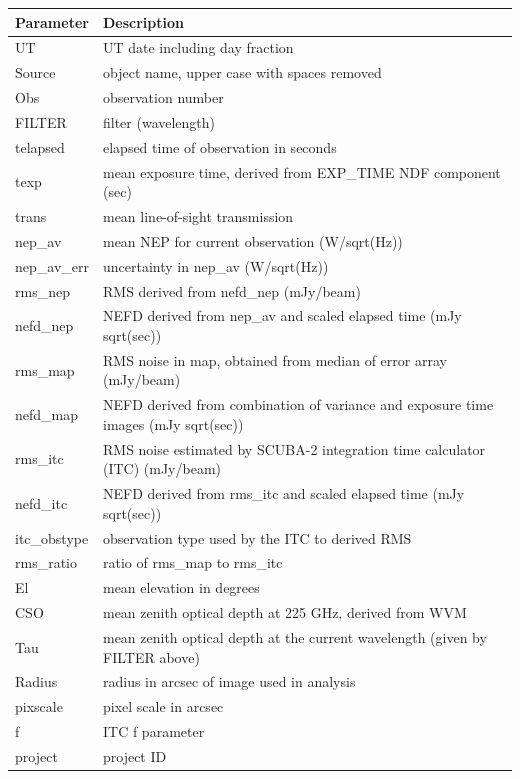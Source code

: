 \documentclass[11pt,oneside,chapters]{starlink}
\begin{document}
\begin{latexonly}
\begin{table}[h!]
\begin{center}
\begin{tabular}{|p{2.5cm}|p{12cm}|}
\hline
\textbf{Parameter} & \textbf{Description}\\
\hline
    UT & UT date including day fraction\\
    Source & object name, upper case with spaces removed\\
    Obs & observation number\\
    FILTER & filter (wavelength)\\
    telapsed & elapsed time of observation in seconds\\
    texp & mean exposure time, derived from EXP\_TIME NDF component (sec)\\
    trans & mean line-of-sight transmission\\
    nep\_av & mean NEP for current observation (W/sqrt(Hz))\\
    nep\_av\_err & uncertainty in nep\_av (W/sqrt(Hz))\\
    rms\_nep & RMS derived from nefd\_nep (mJy/beam)\\
    nefd\_nep & NEFD derived from nep\_av and scaled elapsed time (mJy sqrt(sec))\\
    rms\_map & RMS noise in map, obtained from median of error array (mJy/beam)\\
    nefd\_map & NEFD derived from combination of variance and exposure time images (mJy sqrt(sec))\\
    rms\_itc & RMS noise estimated by SCUBA-2 integration time calculator (ITC) (mJy/beam) \\
    nefd\_itc & NEFD derived from rms\_itc and scaled elapsed time (mJy sqrt(sec)) \\
    itc\_obstype & observation type used by the ITC to derived RMS\\
    rms\_ratio & ratio of rms\_map to rms\_itc\\
    El & mean elevation in degrees\\
    CSO & mean zenith optical depth at 225 GHz, derived from WVM\\
    Tau & mean zenith optical depth at the current wavelength (given by FILTER above)\\
    Radius & radius in arcsec of image used in analysis\\
    pixscale & pixel scale in arcsec\\
    f & ITC f parameter\\
    project & project ID\\
\hline
\end{tabular}
\end{center}
\end{table}
\end{latexonly}
\end{document}
